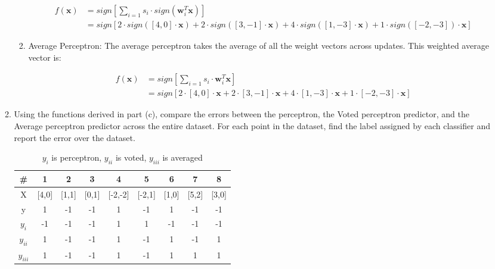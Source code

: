 \documentclass[letterpaper]{article}
\theoremstyle{definition}
\begin{document}
\begin{enumerate}
\begin{enumerate}
\begin{enumerate}
\begin{align*}
f(\mathbf{x}) &= sign\left[\sum_{i=1} s_i \cdot sign(\mathbf{w}_i^T \mathbf{x})\right] \\
&= sign \left[2 \cdot sign([4, 0] \cdot \mathbf{x}) + 2 \cdot sign([3, -1] \cdot \mathbf{x}) +
4 \cdot sign( [1, -3]\cdot \mathbf{x}) + 1 \cdot sign([-2, -3]) \cdot \mathbf{x} \right]
\end{align*}

\item Average Perceptron:
The average perceptron takes the average of all the weight vectors across updates.
This weighted average vector is:

\begin{align*}
f(\mathbf{x}) &= sign \left[ \sum_{i=1} s_i \cdot \mathbf{w}_i^T \mathbf{x}\right] \\
&= sign \left[2 \cdot [4, 0] \cdot \mathbf{x} + 2 \cdot [3, -1] \cdot \mathbf{x} +
4 \cdot [1, -3] \cdot \mathbf{x} + 1 \cdot [-2, -3] \cdot \mathbf{x} \right]
\end{align*}
\end{enumerate}

\color{black}

\item Using the functions derived in part (c), compare the errors between the perceptron,
the Voted perceptron predictor, and the Average perceptron predictor across the entire dataset.
For each point in the dataset, find the label assigned by each classifier and report the error
over the dataset.

\color{teal}
\begin{table}[htbp]
\caption{\(y_i\) is perceptron, \(y_{ii}\) is voted, \(y_{iii}\) is averaged}
\centering
\begin{tabular}{|c|c|c|c|c|c|c|c|c|}
\hline
\hline
\# & 1 & 2 & 3 & 4 & 5 & 6 & 7 & 8\\[0pt]
\hline
X & [4,0] & [1,1] & [0,1] & [-2,-2] & [-2,1] & [1,0] & [5,2] & [3,0]\\[0pt]
\hline
y & 1 & -1 & -1 & 1 & -1 & 1 & -1 & -1\\[0pt]
\hline
\(y_i\) & -1 & -1 & -1 & 1 & 1 & -1 & -1 & -1\\[0pt]
\hline
\(y_{ii}\) & 1 & -1 & -1 & 1 & -1 & 1 & -1 & 1\\[0pt]
\hline
\(y_{iii}\) & 1 & -1 & -1 & 1 & -1 & 1 & 1 & 1\\[0pt]
\hline
\hline
\end{tabular}
\end{table}


\end{enumerate}
\end{enumerate}
\end{document}
